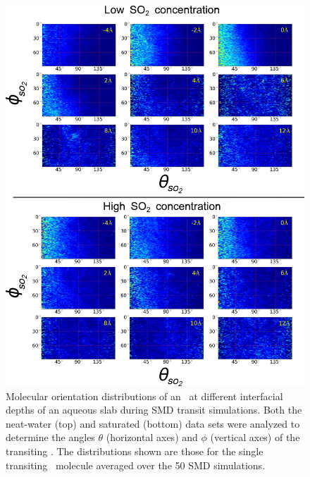 \documentclass{article}
\begin{document}
\begin{figure}[h!]
	\begin{center}
		\includegraphics[scale=1.0]{theta-phi-transit.png}
		\caption{Molecular orientation distributions of an \suldiox~at different interfacial depths of an aqueous slab during SMD transit simulations. Both the neat-water (top) and saturated (bottom) data sets were analyzed to determine the angles $\theta$ (horizontal axes) and $\phi$ (vertical axes) of the transiting \suldiox. The distributions shown are those for the single transiting \suldiox~molecule averaged over the 50 SMD simulations.}
		\label{fig:so2-transit-angles}
	\end{center}
\end{figure}
\end{document}
